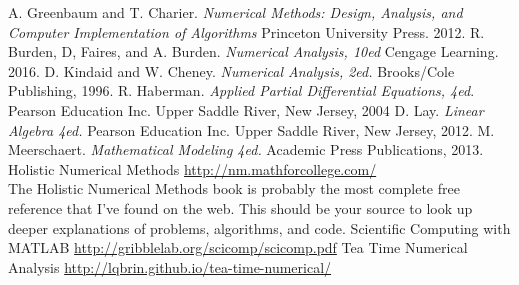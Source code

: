 \documentclass[12pt,oneside]{book}
\theoremstyle{definition}
\begin{document}
\begin{appendix}




% 


\begin{thebibliography}{99}
         A. Greenbaum and T. Charier. {\it Numerical Methods: Design,
            Analysis, and Computer Implementation of Algorithms} Princeton University
            Press. 2012.
         R. Burden, D, Faires, and A. Burden. {\it Numerical Analysis,
            10ed} Cengage Learning. 2016.
         D. Kindaid and W. Cheney. {\it Numerical Analysis, 2ed.}
            Brooks/Cole Publishing, 1996.
         R. Haberman. {\it Applied Partial Differential Equations,
        4ed}.  Pearson Education Inc. Upper Saddle River, New Jersey, 2004
         D. Lay. {\it Linear Algebra 4ed.} Pearson Education Inc. Upper
        Saddle River, New Jersey, 2012.
         M. Meerschaert. {\it Mathematical Modeling 4ed.} Academic
        Press Publications, 2013.
         Holistic Numerical Methods
        \href{http://nm.mathforcollege.com/}{http://nm.mathforcollege.com/}\\
        The Holistic Numerical Methods book is probably the most complete free reference
        that I've found on the web.  This should be your source to look up deeper
        explanations of problems, algorithms, and code.
         Scientific Computing with MATLAB
        \href{http://gribblelab.org/scicomp/scicomp.pdf}{http://gribblelab.org/scicomp/scicomp.pdf}
         Tea Time Numerical Analysis
        \href{http://lqbrin.github.io/tea-time-numerical/}{http://lqbrin.github.io/tea-time-numerical/}
\end{thebibliography}
\end{appendix}
\end{document}
